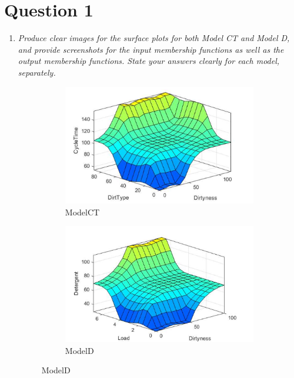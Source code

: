 \documentclass[11pt]{article}
\begin{document}

\section*{Question 1}

\begin{enumerate}[label=(\alph*)]

  \item \textit{Produce clear images for the surface plots for both Model CT
  and Model D, and provide screenshots for the input membership functions as
  well as the output membership functions. State your answers clearly for each
  model, separately.}

  \begin{figure}[ht!]
  \centering
  \begin{subfigure}{.5\textwidth}
    \centering
    \includegraphics[width=.9\linewidth]{res/image1}
    \caption{ModelCT}
    \label{fig:sub1}
  \end{subfigure}%
  \begin{subfigure}{.5\textwidth}
    \centering
    \includegraphics[width=.9\linewidth]{res/image2}
    \caption{ModelD}
    \label{fig:sub2}
  \end{subfigure}
  \end{figure}


\end{enumerate}
\end{document}

